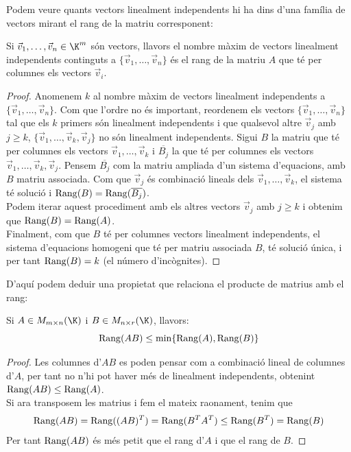 Podem veure quants vectors linealment independents hi ha dins d'una família de vectors mirant el rang de la matriu corresponent:
\begin{lema}\label{lema:rangiLI}
    Si $\vec v_1, \dots ,\vec v_n\in\K^m$ són vectors, llavors el nombre màxim de vectors linealment independents continguts a $\{\vec v_1, \dots ,\vec v_n\}$ és el rang de la matriu $A$ que té per columnes els vectors $\vec v_i$. 
\end{lema}
\begin{proof}
    Anomenem $k$ al nombre màxim de vectors linealment independents a $\{\vec v_1, \dots ,\vec v_n\}$. Com que l'ordre no és important, reordenem els vectors $\{\vec v_1, \dots ,\vec v_n\}$ tal que els $k$ primers són linealment independents i que qualsevol altre $\vec v_j$ amb $j\geq k$, $\{\vec v_1, \dots ,\vec v_k,\vec v_j\}$ no són linealment independents. Sigui $B$ la matriu que té per columnes els vectors $\vec v_1, \dots, \vec v_k$ i $\overline{B_j}$ la que té per columnes els vectors $\vec v_1, \dots, \vec v_k,\vec v_j$. Pensem $\overline{B_j}$ com la matriu ampliada d'un sistema d'equacions, amb $B$  matriu associada. Com que $\vec v_j$ és combinació lineals dels $\vec v_1, \dots, \vec v_k$, el sistema té solució i $\operatorname{Rang}(B)=\operatorname{Rang}(\overline{B_j})$.\\
    Podem iterar aquest procediment amb els altres vectors $\vec v_{j}$ amb $j\geq k$ i obtenim que $\operatorname{Rang}(B)=\operatorname{Rang}(A)$.\\
    Finalment, com que $B$ té per columnes vectors linealment independents, el sistema d'equacions homogeni que té per matriu associada $B$, té solució única, i per tant $\operatorname{Rang}(B)=k$ (el número d'incògnites).
\end{proof}
D'aquí podem deduir una propietat que relaciona el producte de matrius amb el rang:
\begin{corollari}
Si $A\in M_{m\times n}(\K)$ i $B\in M_{n\times r}(\K)$, llavors:
$$
\operatorname{Rang}(AB)\leq \min\{\operatorname{Rang}(A),\operatorname{Rang}(B)\}
$$
\end{corollari}
\begin{proof} 
    Les columnes d'$AB$ es poden pensar com a combinació lineal de columnes d'$A$, per tant no n'hi pot haver més de linealment independents, obtenint $\operatorname{Rang}(AB)\leq\operatorname{Rang}(A)$.\\
    Si ara transposem les matrius i fem el mateix raonament, tenim que $$\operatorname{Rang}(AB)=\operatorname{Rang}((AB)^T)=\operatorname{Rang}(B^TA^T)\leq \operatorname{Rang}(B^T)=\operatorname{Rang}(B)$$
    Per tant $\operatorname{Rang}(AB)$ és més petit que el rang d'$A$ i que el rang de $B$.
\end{proof}

